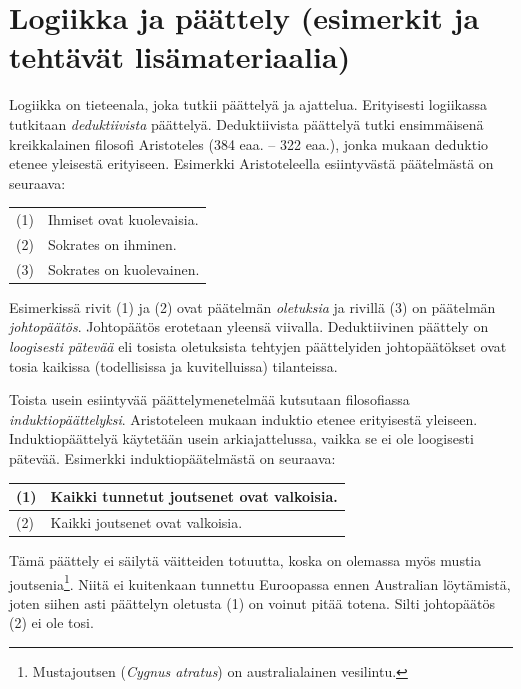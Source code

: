 \chapter{Logiikka ja päättely (esimerkit ja tehtävät lisämateriaalia)}

Logiikka on tieteenala, joka tutkii päättelyä ja ajattelua. Erityisesti logiikassa tutkitaan \emph{deduktiivista} päättelyä. Deduktiivista päättelyä tutki ensimmäisenä kreikkalainen filosofi Aristoteles (384 eaa. -- 322 eaa.), jonka mukaan deduktio etenee yleisestä erityiseen. Esimerkki Aristoteleella esiintyvästä pää\-tel\-mäs\-tä on seuraava:

\bigskip

\begin{center}
\begin{tabular}{ll}
(1) & Ihmiset ovat kuolevaisia.\\ 
(2) & Sokrates on ihminen.\\ \hline
(3) & Sokrates on kuolevainen.
\end{tabular}
\end{center}

\bigskip

Esimerkissä rivit (1) ja (2) ovat päätelmän \emph{oletuksia} ja rivillä (3) on päätelmän \emph{johtopäätös}. Johtopäätös erotetaan yleensä viivalla. Deduktiivinen päättely on {\em loogisesti pätevää} eli tosista oletuksista tehtyjen päättelyiden johtopäätökset ovat tosia kaikissa (todellisissa ja kuvitelluissa) tilanteissa.

Toista usein esiintyvää päättelymenetelmää kutsutaan filosofiassa \emph{induktiopäättelyksi}. Aristoteleen mukaan induktio etenee erityisestä yleiseen.  Induktiopäättelyä käytetään usein arkiajattelussa, vaikka se ei ole loogisesti pätevää. Esimerkki induktiopäätelmästä on seuraava:

\bigskip

\begin{center}
\begin{tabular}{ll}
(1) & Kaikki tunnetut joutsenet ovat valkoisia.\\ \hline
(2) & Kaikki joutsenet ovat valkoisia.
\end{tabular}
\end{center}

\bigskip

Tämä päättely ei säilytä väitteiden totuutta, koska on olemassa myös mustia joutsenia\footnote{Mustajoutsen ({\it Cygnus atratus}) on australialainen vesilintu.}. Niitä ei kuitenkaan tunnettu Euroopassa ennen Australian löytämistä, joten siihen asti päättelyn oletusta (1) on voinut pitää totena. Silti johtopäätös (2) ei ole tosi.

